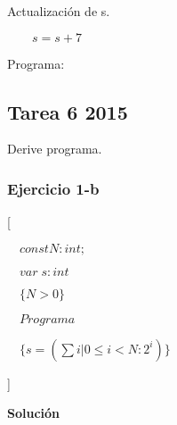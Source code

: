 \documentclass[hidelinks]{article}
\begin{document}
\begin{enumerate}
	      Actualización de s.
	      \begin{center}
		      $\qquad s = s+7$ \par
	      \end{center}

	      Programa: \par
	      [\par
		      $\quad const \; N: int;$\par
		      $\quad var \; r,s,n: int$\par
		      $\quad\{N \geq 0\}$\par
		      $\quad r,s,n := -10,0,0;$\par
		      $\quad\{inv: r = 2 F(n) \land s = G(n) \land 0 \leq n \leq N\}\{cota: N-n\}$\par
		      $\quad do \; x < N \rightarrow $ \par
		      $\qquad r = 10 - 2r + 2s; $ \par
		      $\qquad s = s + 7; $ \par
		      $\qquad n = n+1 $ \par
		      $\quad od $ \par
		      $\quad \{r = 2  F(N)\}$ \par
	      ]

\end{enumerate}

\newpage

\subsection{Tarea 6 2015}


Derive programa. \par

\subsubsection{Ejercicio 1-b}

[\par
	$\quad const N: int;$\par
	$\quad var \; s: int$\par
	$\quad\{N > 0\}$\par
	$\quad Programa $ \par
	$\quad \{s = (\sum i| 0\leq i < N :2^i)\}$ \par
]

\textbf{Solución}
\end{document}

